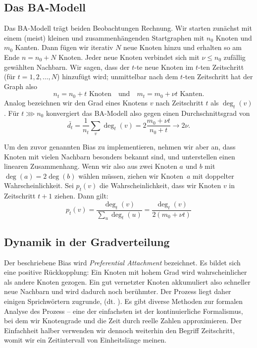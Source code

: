 \subsection{Das BA-Modell}
Das  BA-Modell trägt beiden Beobachtungen Rechnung.
Wir starten zunächst mit einem (meist) kleinen und zusammenhängenden Startgraphen mit $n_0$ Knoten und $m_0$ Kanten.
Dann fügen wir iterativ $N$ neue Knoten hinzu und erhalten so am Ende $n = n_0 + N$ Knoten.
Jeder neue Knoten verbindet sich mit $\nu \le n_0$ zufällig gewählten Nachbarn.
Wir sagen, dass der $t$-te neue Knoten im $t$-ten Zeitschritt (für $t = 1,2, \ldots, N$) hinzufügt wird;
unmittelbar nach dem $t$-ten Zeitschritt hat der Graph also
\begin{equation}
    n_t = n_0 + t \text{ Knoten} \quad \text{und} \quad
    m_t = m_0 + \nu t \text{ Kanten}.
\end{equation}
Analog bezeichnen wir den Grad eines Knotens $v$ nach Zeitschritt $t$ als $\deg_t(v)$.
Für $t \ggg n_0$ konvergiert das BA-Modell also gegen einen Durchschnittsgrad von
\begin{equation}
    \bar{d_t} = \frac{1}{n_t} \sum_{v} \deg_t(v) = 2 \frac{m_0 + \nu t}{n_0 + t} \to 2 \nu.
\end{equation}

Um den zuvor genannten Bias zu implementieren, nehmen wir aber an, dass Knoten mit vielen Nachbarn besonders bekannt sind, und unterstellen einen linearen Zusammenhang.
Wenn wir also aus zwei Knoten $a$ und $b$ mit $\deg(a) = 2\deg(b)$ wählen müssen, ziehen wir Knoten~$a$ mit doppelter Wahrscheinlichkeit.
Sei $p_t(v)$ die Wahrscheinlichkeit, dass wir Knoten $v$ in Zeitschritt $t + 1$ ziehen.
Dann gilt:
\begin{equation}
    p_t(v) = \frac{\deg_t(v)}{\sum_u  \deg_t(u)} = \frac{\deg_t(v)}{2(m_0 + \nu t)}
\end{equation}

\subsection{Dynamik in der Gradverteilung}
Der beschriebene Bias wird \emph{Preferential Attachment} bezeichnet.
Es bildet sich eine positive Rückkopplung:
Ein Knoten mit hohem Grad wird wahrscheinlicher als andere Knoten gezogen.
Ein gut vernetzter Knoten akkumuliert also schneller neue Nachbarn und wird dadurch noch berühmter.
Der Prozess liegt daher einigen Sprichwörtern zugrunde, \zB {} (dt. ).
Es gibt diverse Methoden zur formalen Analyse des Prozess -- eine der einfachsten ist der kontinuierliche Formalismus, bei dem wir Knotengrade und die Zeit durch reelle Zahlen approximieren.
Der Einfachheit halber verwenden wir dennoch weiterhin den Begriff Zeitschritt, womit wir ein Zeitintervall von Einheitslänge meinen.

